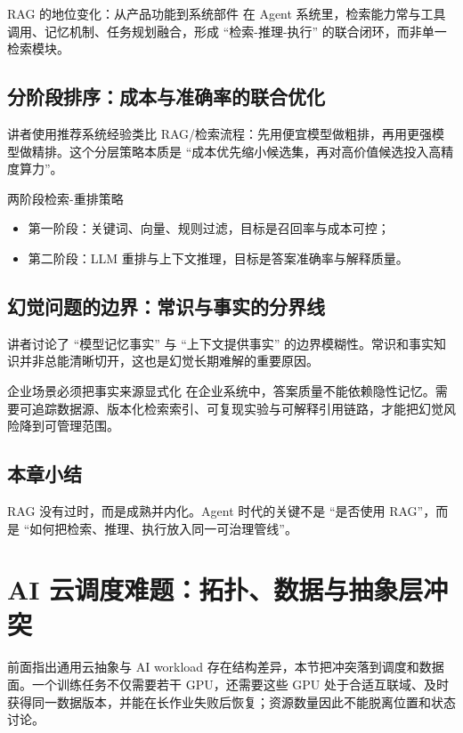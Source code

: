 \documentclass[a4paper]{article}
\begin{document}
\begin{importantbox}{RAG 的地位变化：从产品功能到系统部件}
在 Agent 系统里，检索能力常与工具调用、记忆机制、任务规划融合，形成 ``检索-推理-执行'' 的联合闭环，而非单一检索模块。
\end{importantbox}

\subsection{分阶段排序：成本与准确率的联合优化}
讲者使用推荐系统经验类比 RAG/检索流程：先用便宜模型做粗排，再用更强模型做精排。这个分层策略本质是 ``成本优先缩小候选集，再对高价值候选投入高精度算力''。

\begin{knowledgebox}{两阶段检索-重排策略}
\begin{itemize}
    \item 第一阶段：关键词、向量、规则过滤，目标是召回率与成本可控；
    \item 第二阶段：LLM 重排与上下文推理，目标是答案准确率与解释质量。
\end{itemize}
\end{knowledgebox}

\subsection{幻觉问题的边界：常识与事实的分界线}
讲者讨论了 ``模型记忆事实'' 与 ``上下文提供事实'' 的边界模糊性。常识和事实知识并非总能清晰切开，这也是幻觉长期难解的重要原因。

\begin{warningbox}{企业场景必须把事实来源显式化}
在企业系统中，答案质量不能依赖隐性记忆。需要可追踪数据源、版本化检索索引、可复现实验与可解释引用链路，才能把幻觉风险降到可管理范围。
\end{warningbox}

\subsection{本章小结}
RAG 没有过时，而是成熟并内化。Agent 时代的关键不是 ``是否使用 RAG''，而是 ``如何把检索、推理、执行放入同一可治理管线''。

\section{AI 云调度难题：拓扑、数据与抽象层冲突}

前面指出通用云抽象与 AI workload 存在结构差异，本节把冲突落到调度和数据面。一个训练任务不仅需要若干 GPU，还需要这些 GPU 处于合适互联域、及时获得同一数据版本，并能在长作业失败后恢复；资源数量因此不能脱离位置和状态讨论。
\end{document}

